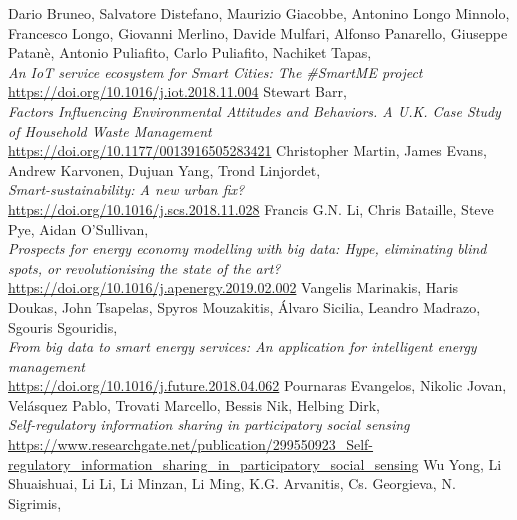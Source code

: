 \documentclass[11pt]{article}
\begin{document}
\begin{thebibliography}{25}
	Dario Bruneo, Salvatore Distefano, Maurizio Giacobbe, Antonino Longo Minnolo, Francesco Longo, Giovanni Merlino, Davide Mulfari, Alfonso Panarello, Giuseppe Patanè, Antonio Puliafito, Carlo Puliafito, Nachiket Tapas, \\
	\textit{An IoT service ecosystem for Smart Cities: The \#SmartME project}\\
	\hyperref[https://doi.org/10.1016/j.iot.2018.11.004]{https://doi.org/10.1016/j.iot.2018.11.004}
	Stewart Barr, \\
	\textit{Factors Influencing Environmental Attitudes and Behaviors. A U.K. Case Study of Household Waste Management}\\
	\hyperref[https://doi.org/10.1177/0013916505283421]{https://doi.org/10.1177/0013916505283421}
	Christopher Martin, James Evans, Andrew Karvonen, Dujuan Yang, Trond Linjordet, \\
	\textit{Smart-sustainability: A new urban fix?}\\
	\hyperref[https://doi.org/10.1016/j.scs.2018.11.028]{https://doi.org/10.1016/j.scs.2018.11.028}
	Francis G.N. Li, Chris Bataille, Steve Pye, Aidan O'Sullivan, \\
	\textit{Prospects for energy economy modelling with big data: Hype, eliminating blind spots, or revolutionising the state of the art?}\\
	\hyperref[https://doi.org/10.1016/j.apenergy.2019.02.002]{https://doi.org/10.1016/j.apenergy.2019.02.002}
	Vangelis Marinakis, Haris Doukas, John Tsapelas, Spyros Mouzakitis, Álvaro Sicilia, Leandro Madrazo, Sgouris Sgouridis, \\
	\textit{From big data to smart energy services: An application for intelligent energy management}\\
	\hyperref[https://doi.org/10.1016/j.future.2018.04.062]{https://doi.org/10.1016/j.future.2018.04.062}
	Pournaras Evangelos, Nikolic Jovan, Velásquez Pablo, Trovati Marcello, Bessis Nik, Helbing Dirk, \\
	\textit{Self-regulatory information sharing in participatory social sensing}\\
	\hyperref[https://www.researchgate.net/publication/299550923_Self-regulatory_information_sharing_in_participatory_social_sensing]{https://www.researchgate.net/publication/299550923\_Self-regulatory\_information\_sharing\_in\_participatory\_social\_sensing}
	Wu Yong, Li Shuaishuai, Li Li, Li Minzan, Li Ming, K.G. Arvanitis, Cs. Georgieva, N. Sigrimis, \\

\end{thebibliography}
\end{document}
